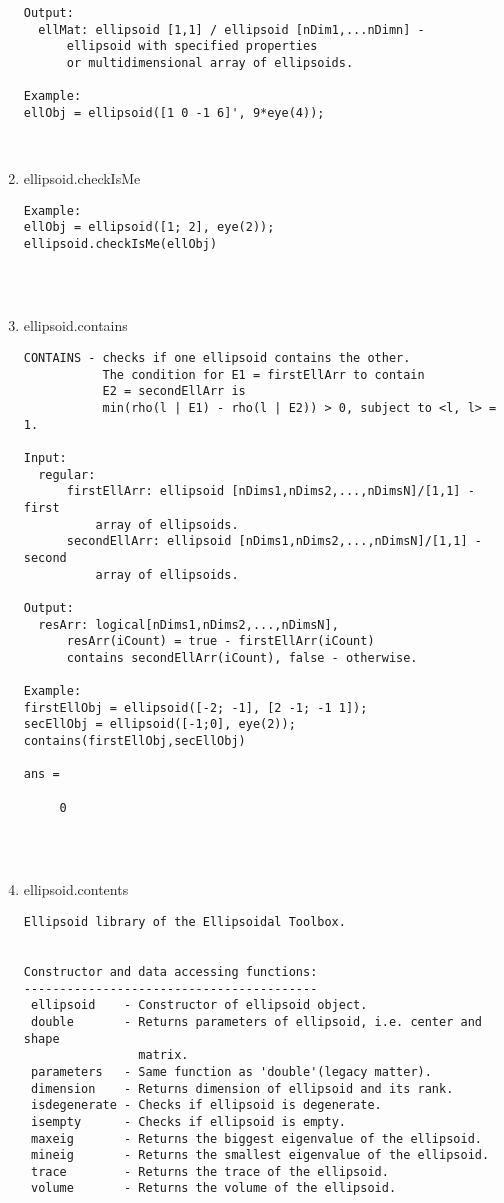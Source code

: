 \begin{enumerate}
\begin{lstlisting}
Output:
  ellMat: ellipsoid [1,1] / ellipsoid [nDim1,...nDimn] -
      ellipsoid with specified properties
      or multidimensional array of ellipsoids.

Example:
ellObj = ellipsoid([1 0 -1 6]', 9*eye(4));



\end{lstlisting}
\fontfamily{\familydefault}
\selectfont
\item {ellipsoid.checkIsMe}
\selectfont
\begin{lstlisting}
Example:
ellObj = ellipsoid([1; 2], eye(2));
ellipsoid.checkIsMe(ellObj)




\end{lstlisting}
\fontfamily{\familydefault}
\selectfont
\item {ellipsoid.contains}
\selectfont
\begin{lstlisting}
CONTAINS - checks if one ellipsoid contains the other.
           The condition for E1 = firstEllArr to contain
           E2 = secondEllArr is
           min(rho(l | E1) - rho(l | E2)) > 0, subject to <l, l> = 1.

Input:
  regular:
      firstEllArr: ellipsoid [nDims1,nDims2,...,nDimsN]/[1,1] - first
          array of ellipsoids.
      secondEllArr: ellipsoid [nDims1,nDims2,...,nDimsN]/[1,1] - second
          array of ellipsoids.

Output:
  resArr: logical[nDims1,nDims2,...,nDimsN],
      resArr(iCount) = true - firstEllArr(iCount)
      contains secondEllArr(iCount), false - otherwise.

Example:
firstEllObj = ellipsoid([-2; -1], [2 -1; -1 1]);
secEllObj = ellipsoid([-1;0], eye(2));
contains(firstEllObj,secEllObj)

ans =

     0




\end{lstlisting}
\fontfamily{\familydefault}
\selectfont
\item {ellipsoid.contents}
\selectfont
\begin{lstlisting}
Ellipsoid library of the Ellipsoidal Toolbox.


Constructor and data accessing functions:
-----------------------------------------
 ellipsoid    - Constructor of ellipsoid object.
 double       - Returns parameters of ellipsoid, i.e. center and shape
                matrix.
 parameters   - Same function as 'double'(legacy matter).
 dimension    - Returns dimension of ellipsoid and its rank.
 isdegenerate - Checks if ellipsoid is degenerate.
 isempty      - Checks if ellipsoid is empty.
 maxeig       - Returns the biggest eigenvalue of the ellipsoid.
 mineig       - Returns the smallest eigenvalue of the ellipsoid.
 trace        - Returns the trace of the ellipsoid.
 volume       - Returns the volume of the ellipsoid.



\end{lstlisting}
\end{enumerate}
